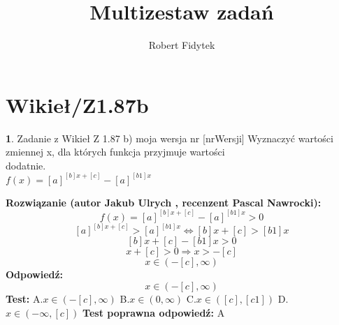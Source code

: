 \documentclass[12pt, a4paper]{article}
\title{Multizestaw zadań}
\author{Robert Fidytek}
\date{}
\theoremstyle{definition} %
\newtheorem{zad}{}
\newcommand{\kategoria}[1]{\section{#1}} %
\newcommand{\zadStart}[1]{\begin{zad}#1\newline} %
\newcommand{\zadStop}{\end{zad}}   %
\newcommand{\rozwStart}[2]{\noindent \textbf{Rozwiązanie (autor #1 , recenzent #2): }\newline} %
\newcommand{\rozwStop}{\newline}                                            %
\newcommand{\odpStart}{\noindent \textbf{Odpowiedź:}\newline}    %
\newcommand{\odpStop}{\newline}                                             %
\newcommand{\testStart}{\noindent \textbf{Test:}\newline} %
\newcommand{\testStop}{\newline} %
\newcommand{\kluczStart}{\noindent \textbf{Test poprawna odpowiedź:}\newline} %
\newcommand{\kluczStop}{\newline} %
\begin{document}
\maketitle


\kategoria{Wikieł/Z1.87b}
\zadStart{Zadanie z Wikieł Z 1.87 b) moja wersja nr [nrWersji]}
Wyznaczyć wartości zmiennej x, dla których funkcja przyjmuje wartości\\ dodatnie.\\ $f(x)=[a]^{[b]x+[c]}-[a]^{[b1]x}$
\zadStop
\rozwStart{Jakub Ulrych}{Pascal Nawrocki}
$$f(x)=[a]^{[b]x+[c]}-[a]^{[b1]x}>0$$
$$[a]^{[b]x+[c]}>[a]^{[b1]x}\Leftrightarrow [b]x+[c]>[b1]x$$
$$[b]x+[c]-[b1]x>0$$
$$x+[c]>0\Rightarrow x>-[c]$$
$$x\in(-[c],\infty)$$
\rozwStop
\odpStart
$$x\in(-[c],\infty)$$
\odpStop
\testStart
A.$x\in(-[c],\infty)$
B.$x\in(0,\infty)$
C.$x\in([c],[c1])$
D.$x\in(-\infty,[c])$
\testStop
\kluczStart
A
\kluczStop
\end{document}
